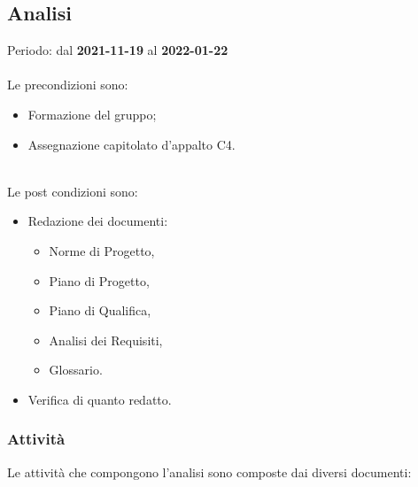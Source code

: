 

\subsection{Analisi} 

Periodo: dal \textbf{2021-11-19} al \textbf{2022-01-22}  \mbox{} \\ \mbox{} \\
Le precondizioni sono:
\begin{itemize}
\item Formazione del gruppo;
\item Assegnazione capitolato d’appalto C4.
\end{itemize}  \mbox{} \\
Le post condizioni sono:
\begin{itemize}
\item Redazione dei documenti:
\begin{itemize}
	\item Norme di Progetto,
	\item Piano di Progetto,
	\item Piano di Qualifica,
	\item Analisi dei Requisiti,
	\item Glossario.
\end{itemize}
\item Verifica di quanto redatto.
\end{itemize}

\subsubsection{Attività}

Le attività che compongono l’analisi sono composte dai diversi documenti:

